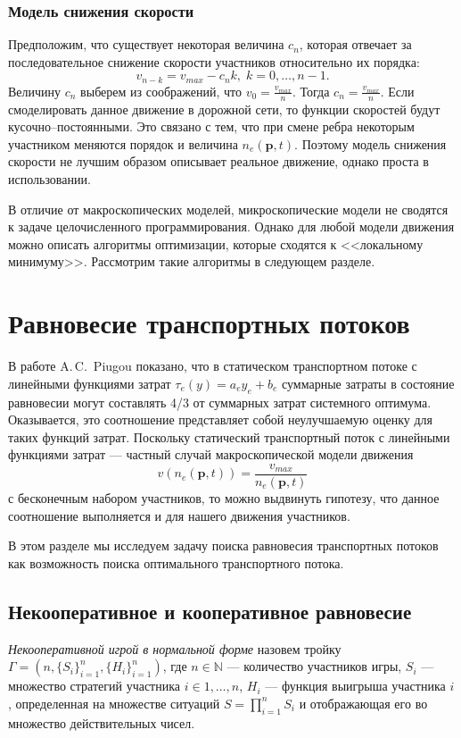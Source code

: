 \documentclass[12pt, a4paper]{article}
\begin{document}
\subsubsection*{Модель снижения скорости}

Предположим, что существует некоторая величина $c_n$, которая отвечает за последовательное снижение скорости участников относительно их порядка:
$$v_{n - k} = v_{max} - c_n k, \; k = 0, \dots, n - 1.$$
Величину $c_n$ выберем из соображений, что $v_0 = \frac{v_{max}}{n}$. Тогда $c_n = \frac{v_{max}}{n}$. Если смоделировать данное движение в дорожной сети, то функции скоростей будут кусочно--постоянными. Это связано с тем, что при смене ребра некоторым участником меняются порядок и величина $n_e(\textbf{p}, t)$. Поэтому модель снижения скорости не лучшим образом описывает реальное движение, однако проста в использовании.

В отличие от макроскопических моделей, микроскопические модели не сводятся к задаче целочисленного программирования. Однако для любой модели движения можно описать алгоритмы оптимизации, которые сходятся к <<локальному минимуму>>. Рассмотрим такие алгоритмы в следующем разделе.

\newpage
\section{Равновесие транспортных потоков}
\label{sec:rovn}
В работе A.\,C.~Piugou \cite{piugou} показано, что в статическом транспортном потоке с линейными функциями затрат $\tau_e(y) = a_e y_e + b_e$ суммарные затраты в состояние равновесии могут составлять 4/3 от суммарных затрат системного оптимума. Оказывается, это соотношение представляет собой неулучшаемую оценку для таких функций затрат. Поскольку статический транспортный поток с линейными функциями затрат --- частный случай макроскопической модели движения 
$$v (n_e (\textbf{p}, t)) = \frac{v_{max}}{n_e (\textbf{p}, t)}$$
с бесконечным набором участников, то можно выдвинуть гипотезу, что данное соотношение выполняется и для нашего движения участников.

В этом разделе мы исследуем задачу поиска равновесия транспортных потоков как возможность поиска оптимального транспортного потока.

\subsection{Некооперативное и кооперативное равновесие}

\textit{Некооперативной игрой в нормальной форме} назовем тройку $\Gamma = (n, \{S_i\}_{i = 1}^n, \{H_i\}_{i = 1}^n)$, где $n \in \mathbb{N}$ --- количество участников игры, $S_i$ --- множество стратегий участника $i \in {1, \dots, n}$, $H_i$ --- функция выигрыша участника $i$, определенная на множестве ситуаций $S = \prod\limits_{i = 1}^n S_i$ и отображающая его во множество действительных чисел.
\end{document}
